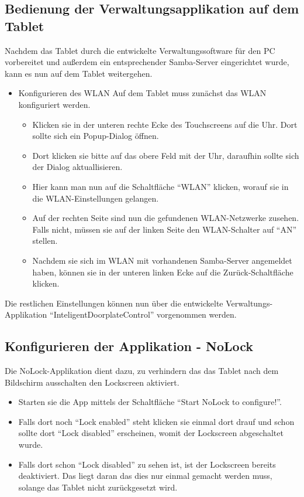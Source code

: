 \begin{flushleft}
\section{Bedienung der Verwaltungsapplikation auf dem Tablet}
  Nachdem das Tablet durch die entwickelte Verwaltungssoftware für den PC vorbereitet und außerdem ein entsprechender Samba-Server eingerichtet wurde, kann es nun auf dem Tablet weitergehen.
  \begin{itemize}
  \item{Konfigurieren des WLAN}
    Auf dem Tablet muss zunächst das WLAN konfiguriert werden.
    \begin{itemize}
      \item Klicken sie in der unteren rechte Ecke des Touchscreens auf die Uhr. Dort sollte sich ein Popup-Dialog öffnen.
      \item Dort klicken sie bitte auf das obere Feld mit der Uhr, daraufhin sollte sich der Dialog aktuallisieren.
      \item Hier kann man nun auf die Schaltfläche ``WLAN'' klicken, worauf sie in die WLAN-Einstellungen gelangen.
      \item Auf der rechten Seite sind nun die gefundenen WLAN-Netzwerke zusehen. Falls nicht, müssen sie auf der linken Seite den WLAN-Schalter auf ``AN'' stellen.
      \item Nachdem sie sich im WLAN mit vorhandenen Samba-Server angemeldet haben, können sie in der unteren linken Ecke auf die Zurück-Schaltfläche klicken.
    \end{itemize}
  \end{itemize}
  Die restlichen Einstellungen können nun über die entwickelte Verwaltungs-Applikation ``InteligentDoorplateControl'' vorgenommen werden.
  \subsection{Konfigurieren der Applikation - NoLock}
    Die NoLock-Applikation dient dazu, zu verhindern das das Tablet nach dem Bildschirm ausschalten den Lockscreen aktiviert.
    \begin{itemize}
      \item Starten sie die App mittels der Schaltfläche ``Start NoLock to configure!''.
      \item Falls dort noch ``Lock enabled'' steht klicken sie einmal dort drauf und schon sollte dort ``Lock disabled'' erscheinen, womit der Lockscreen abgeschaltet wurde.
      \item Falls dort schon ``Lock disabled'' zu sehen ist, ist der Lockscreen bereits deaktiviert. Das liegt daran das dies nur einmal gemacht werden muss, solange das Tablet nicht zurückgesetzt wird.
    \end{itemize}

\end{flushleft}
